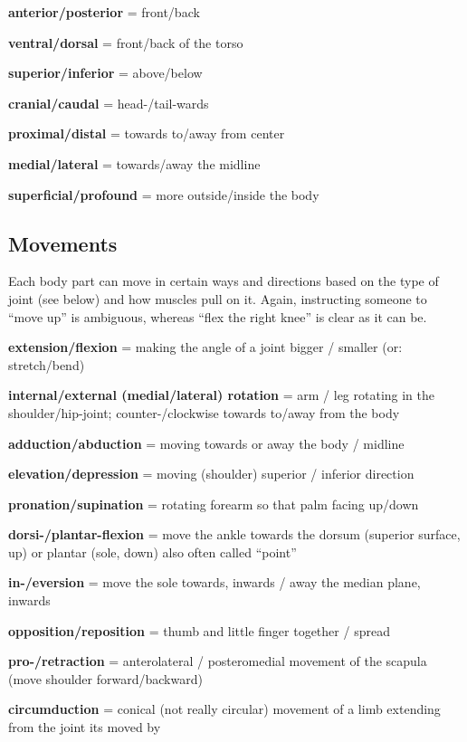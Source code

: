 \begin{itemize*}
    \item \textbf{anterior/posterior} = front/back
    \item \textbf{ventral/dorsal} = front/back of the torso
    \item \textbf{superior/inferior} = above/below
    \item \textbf{cranial/caudal} = head-/tail-wards
    \item \textbf{proximal/distal} = towards to/away from center
    \item \textbf{medial/lateral} = towards/away the midline
    \item \textbf{superficial/profound} = more outside/inside the body
\end{itemize*}

\subsection{Movements}

Each body part can move in certain ways and directions based on the type of joint (see below) and how muscles pull on it.
Again, instructing someone to ``move up'' is ambiguous, whereas ``flex the right knee'' is clear as it can be.

\begin{itemize*}
    \item \textbf{extension/flexion} = making the angle of a joint bigger / smaller (or: stretch/bend)
    \item \textbf{internal/external (medial/lateral) rotation} = arm / leg rotating in the shoulder/hip-joint; counter-/clockwise towards to/away from the body
    \item \textbf{adduction/abduction} = moving towards or away the body / midline
    \item \textbf{elevation/depression} = moving (shoulder) superior / inferior direction
    \item \textbf{pronation/supination} = rotating forearm so that palm facing up/down
    \item \textbf{dorsi-/plantar-flexion} = move the ankle towards the dorsum (superior surface, up) or plantar (sole, down) also often called ``point''
    \item \textbf{in-/eversion} = move the sole towards, inwards / away the median plane, inwards
    \item \textbf{opposition/reposition} = thumb and little finger together / spread
    \item \textbf{pro-/retraction} = anterolateral / posteromedial movement of the scapula (move shoulder forward/backward)
    \item \textbf{circumduction} = conical (not really circular) movement of a limb extending from the joint its moved by
\end{itemize*}

